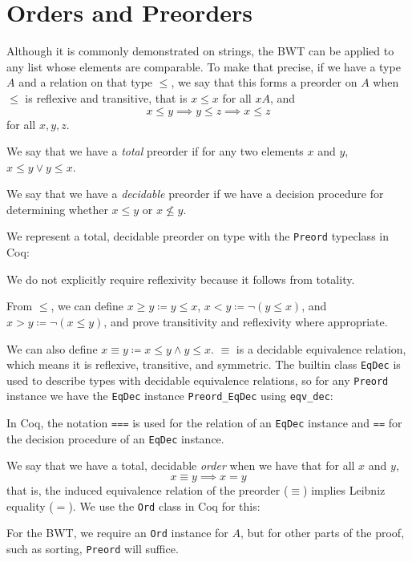 \documentclass[11pt]{thesis}
\begin{document}
\section{Orders and Preorders}
\label{sec:ord}

Although it is commonly demonstrated on strings, the BWT can be
applied to any list whose elements are comparable. To make that
precise, if we have a type $A$ and a relation on that type $\le$, we say
that this forms a preorder on $A$ when $\le$ is reflexive and transitive, that is
$x \le x$ for all $xA$, and
\begin{equation*}
  x \le y \implies y \le z \implies x \le z
\end{equation*}
for all $x,y,z$.

We say that we have a \textit{total} preorder if for any two elements
$x$ and $y$, $x \le y \lor y \le x$.

We say that we have a \textit{decidable} preorder if we have a
decision procedure for determining whether $x \le y$ or $x \not\le y$.

We represent a total, decidable preorder on type with the
\texttt{Preord} typeclass in Coq:

We do not explicitly require reflexivity because it follows from totality.

From $\le$, we can define $x \ge y \coloneqq y \le x$, $x < y \coloneqq
\lnot (y \le x)$, and $x > y \coloneqq \lnot (x \le y)$, and prove
transitivity and reflexivity where appropriate.

We can also define $x \equiv y \coloneqq x \le y \land y \le x$. $\equiv$ is a
decidable equivalence relation, which means it is reflexive,
transitive, and symmetric. The builtin class \texttt{EqDec} is used to
describe types with decidable equivalence relations, so for any
\texttt{Preord} instance we have the \texttt{EqDec} instance
\texttt{Preord\_EqDec} using \texttt{eqv\_dec}:

In Coq, the notation \texttt{===} is used for the relation of an
\texttt{EqDec} instance and \texttt{==} for the decision procedure of
an \texttt{EqDec} instance.

We say that we have a total, decidable \textit{order} when we have
that for all $x$ and $y$,
\begin{equation*}
  x \equiv y \implies x = y
\end{equation*}
that is, the induced equivalence relation of the preorder ($\equiv$)
implies Leibniz equality ($=$). We use the \texttt{Ord} class in Coq for this:

For the BWT, we require an \texttt{Ord} instance for $A$, but for other parts of the proof, such as sorting, \texttt{Preord} will suffice.
\end{document}
